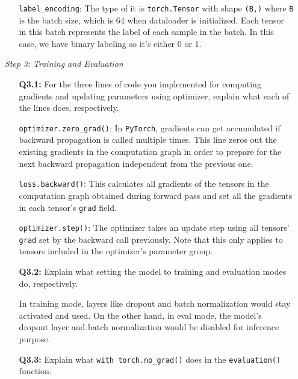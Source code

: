 \documentclass{article}
\newenvironment{solution}{\color{blue}}{}
\begin{document}
\begin{itemize}
\begin{itemize}
\begin{solution}
      \texttt{label\_encoding}: The type of it is \texttt{torch.Tensor} with shape \texttt{(B,)} where \texttt{B} is the batch size, which is 64 when dataloader is initialized. Each tensor in this batch represents the label of each sample in the batch. In this case, we have binary labeling so it's either 0 or 1.
    \end{solution}
  \end{itemize}
  
  \item[\textit{Step 3:}] \textit{Training and Evaluation}

  \begin{itemize}
    \item[\textbf{Q3.1:}] For the three lines of code you implemented for computing gradients and updating parameters using optimizer, explain what each of the lines does, respectively.
    
    \begin{solution}
      \texttt{optimizer.zero\_grad()}: In \texttt{PyTorch}, gradients can get accumulated if backward propagation is called multiple times. This line zeros out the existing gradients in the computation graph in order to prepare for the next backward propagation independent from the previous one.
      
      \texttt{loss.backward()}: This calculates all gradients of the tensors in the computation graph obtained during forward pass and set all the gradients in each tensor's \texttt{grad} field.
      
      \texttt{optimizer.step()}: The optimizer takes an update step using all tensors' \texttt{grad} set by the backward call previously. Note that this only applies to tensors included in the optimizer's parameter group.
    \end{solution}
    
    \item[\textbf{Q3.2:}] Explain what setting the model to training and evaluation modes do, respectively.

    \begin{solution}
      In training mode, layers like dropout and batch normalization would stay activated and used. On the other hand, in eval mode, the model's dropout layer and batch normalization would be disabled for inference purpose.
    \end{solution}
    
    \item[\textbf{Q3.3:}] Explain what \texttt{with torch.no\_grad()} does in the \texttt{evaluation()} function.


\end{itemize}
\end{itemize}
\end{document}
